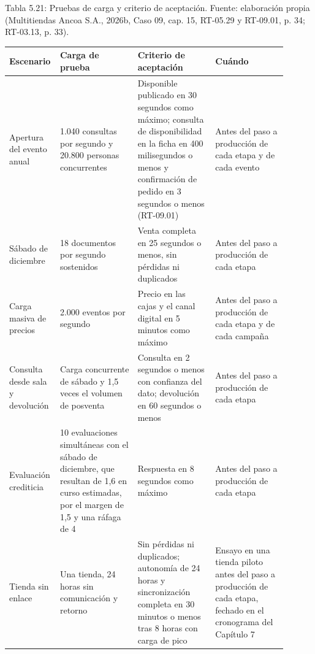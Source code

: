 \documentclass[11pt]{article}
\begin{document}
\par\vspace{0.6\baselineskip}\noindent\begin{minipage}{\linewidth}
Tabla 5.21: Pruebas de carga y criterio de aceptación. Fuente: elaboración propia (Multitiendas Ancoa S.A., 2026b, Caso 09, cap. 15, RT-05.29 y RT-09.01, p. 34; RT-03.13, p. 33).\label{tab:t26}\par\vspace{0.3\baselineskip}
\begin{tabular}{@{}p{0.101\linewidth}p{0.272\linewidth}p{0.272\linewidth}p{0.257\linewidth}@{}}
\toprule Escenario & Carga de prueba & Criterio de aceptación & Cuándo \\
\midrule
Apertura del evento anual & 1.040 consultas por segundo y 20.800 personas concurrentes & Disponible publicado en 30 segundos como máximo; consulta de disponibilidad en la ficha en 400 milisegundos o menos y confirmación de pedido en 3 segundos o menos (RT-09.01) & Antes del paso a producción de cada etapa y de cada evento \\
Sábado de diciembre & 18 documentos por segundo sostenidos & Venta completa en 25 segundos o menos, sin pérdidas ni duplicados & Antes del paso a producción de cada etapa \\
Carga masiva de precios & 2.000 eventos por segundo & Precio en las cajas y el canal digital en 5 minutos como máximo & Antes del paso a producción de cada etapa y de cada campaña \\
Consulta desde sala y devolución & Carga concurrente de sábado y 1,5 veces el volumen de posventa & Consulta en 2 segundos o menos con confianza del dato; devolución en 60 segundos o menos & Antes del paso a producción de cada etapa \\
Evaluación crediticia & 10 evaluaciones simultáneas con el sábado de diciembre, que resultan de 1,6 en curso estimadas, por el margen de 1,5 y una ráfaga de 4 & Respuesta en 8 segundos como máximo & Antes del paso a producción de cada etapa \\
Tienda sin enlace & Una tienda, 24 horas sin comunicación y retorno & Sin pérdidas ni duplicados; autonomía de 24 horas y sincronización completa en 30 minutos o menos tras 8 horas con carga de pico & Ensayo en una tienda piloto antes del paso a producción de cada etapa, fechado en el cronograma del Capítulo 7 \\
\bottomrule
\end{tabular}
\end{minipage}
\par
\end{document}
